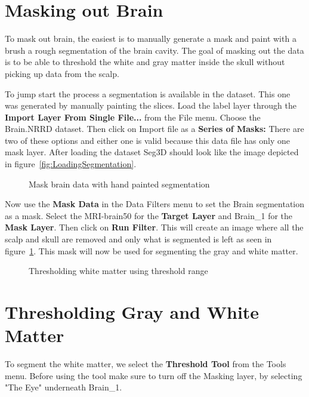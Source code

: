 \documentclass[fleqn,11pt,openany]{book}
\begin{document}
\section{Masking out Brain}

To mask out brain, the easiest is to manually generate a mask and paint with a brush a rough segmentation of the brain cavity. The goal of masking out the data is to be able to threshold the white and gray matter inside the skull without picking up data from the scalp.

To jump start the process a segmentation is available in the dataset. This one was generated by manually painting the slices. Load the label layer through the {\bf Import Layer From Single File...} from the  File menu. Choose the Brain.NRRD dataset.  Then click on Import file as a {\bf Series of Masks:} There are two of these options and either one is valid because this data file has only one mask layer.  After loading the dataset Seg3D should look like the image depicted in figure~\ref{fig:LoadingSegmentation}.

\begin{figure}
\caption{Mask brain data with hand painted segmentation}\label{fig:MaskDataBrain}
\end{figure}

Now use the {\bf Mask Data} in the Data Filters menu to set the  Brain segmentation as a mask. Select the MRI-brain50 for the {\bf Target Layer} and Brain\_1 for the {\bf Mask Layer}. Then click on {\bf Run Filter}. This will create an image where all the scalp and skull are removed and only what is segmented is left as seen in figure~\ref{fig:MaskDataBrain}. This mask will now be used for segmenting the gray and white matter.


\begin{figure}
\caption{Thresholding white matter using threshold range}\label{fig:ThresholdWhiteMatter}
\end{figure}

\section{Thresholding Gray and White Matter}

To segment the white matter, we select the {\bf Threshold Tool} from the Tools menu. Before using the tool make sure to turn off the Masking layer, by selecting  "The Eye" underneath Brain\_1. 
\end{document}
